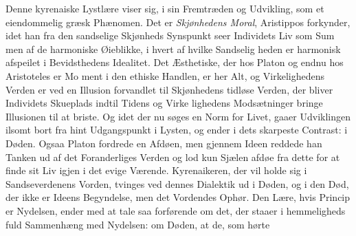 \documentclass[12pt,a4paper]{book}
\newcommand{\divrule}{\begin{center}\rule{2cm}{0.4pt}\end{center}}
\begin{document}
Denne kyrenaiske Lystlære viser sig, i sin Fremtræden
og Udvikling, som et eiendommelig græsk Phænomen. Det er
\emph{Skjønhedens Moral}, Aristippos forkynder, idet han fra den
sandselige Skjønheds Synspunkt seer Individets Liv som Sum\-%
men af de harmoniske Øieblikke, i hvert af hvilke Sandselig\-%
heden er harmonisk afspeilet i Bevidsthedens Idealitet. Det
Æsthetiske, der hos Platon og endnu hos Aristoteles er Mo\-%
ment i den ethiske Handlen, er her Alt, og Virkelighedens
Verden er ved en Illusion forvandlet til Skjønhedens tidløse
Verden, der bliver Individets Skueplads indtil Tidens og Virke\-%
lighedens Modsætninger bringe Illusionen til at briste. Og
idet der nu søges en Norm for Livet, gaaer Udviklingen ilsomt
bort fra hint Udgangspunkt i Lysten, og ender i dets skarpeste
Contrast: i Døden. Ogsaa Platon fordrede en Afdøen, men
gjennem Ideen reddede han Tanken ud af det Foranderliges
Verden og lod kun Sjælen afdøe fra dette for at finde sit Liv
igjen i det evige Værende. Kyrenaikeren, der vil holde sig i
Sandseverdenens Vorden, tvinges ved dennes Dialektik ud i
Døden, og i den Død, der ikke er Ideens Begyndelse, men det
Vordendes Ophør. Den Lære, hvis Princip er Nydelsen, ender
med at tale saa forførende om det, der staaer i hemmeligheds\-%
fuld Sammenhæng med Nydelsen: om Døden, at de, som hørte
\end{document}
